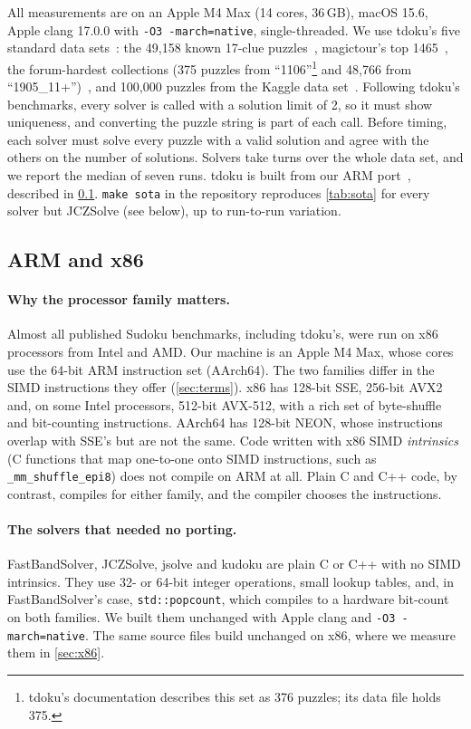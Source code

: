 \documentclass[11pt]{article}
\theoremstyle{definition}
\theoremstyle{plain}
\begin{document}
All measurements are on an Apple M4 Max (14 cores, 36\,GB), macOS 15.6, Apple clang 17.0.0 with \texttt{-O3
-march=native}, single-threaded. We use tdoku's five standard data sets~\cite{dillon2019nerdsniped}: the 49{,}158
known 17-clue puzzles~\cite{royle17clue,champagne2022all17}, magictour's top 1465~\cite{stertenbrink2005top1465}, the forum-hardest collections (375
puzzles from ``1106''\footnote{tdoku's documentation describes this set as 376 puzzles; its data file holds 375.} and
48{,}766 from ``1905\_11+'')~\cite{forumhardest}, and 100{,}000 puzzles from the Kaggle
data set~\cite{park2016kaggle}. Following tdoku's benchmarks, every solver is called with a solution limit of 2, so it
must show uniqueness, and converting the puzzle string is part of each call. Before timing, each solver must solve
every puzzle with a valid solution and agree with the others on the number of solutions. Solvers take turns over the
whole data set, and we report the median of seven runs. tdoku is built from our ARM port~\cite{kelly2026tdokuarm}, described in \cref{sec:arm}. \texttt{make sota} in the repository reproduces \cref{tab:sota} for every solver but JCZSolve (see below), up to run-to-run variation.

\subsection{ARM and x86}
\label{sec:arm}

\paragraph{Why the processor family matters.} Almost all published Sudoku benchmarks, including tdoku's, were run on
x86 processors from Intel and AMD. Our machine is an Apple M4 Max, whose cores use the 64-bit ARM instruction set
(AArch64). The two families differ in the SIMD instructions they offer (\cref{sec:terms}). x86 has 128-bit SSE, 256-bit
AVX2 and, on some Intel processors, 512-bit AVX-512, with a rich set of byte-shuffle and bit-counting instructions.
AArch64 has 128-bit NEON, whose instructions overlap with SSE's but are not the same. Code written with x86 SIMD
\emph{intrinsics} (C functions that map one-to-one onto SIMD instructions, such as \texttt{\_mm\_shuffle\_epi8}) does
not compile on ARM at all. Plain C and C++ code, by contrast, compiles for either family, and the compiler chooses the
instructions.

\paragraph{The solvers that needed no porting.} FastBandSolver, JCZSolve, jsolve and kudoku are plain C or C++ with
no SIMD intrinsics. They use 32- or 64-bit integer operations, small lookup tables, and, in FastBandSolver's case,
\texttt{std::popcount}, which compiles to a hardware bit-count on both families. We built them unchanged with Apple
clang and \texttt{-O3 -march=native}. The same source files build unchanged on x86, where we measure them in
\cref{sec:x86}.
\end{document}
